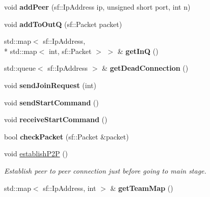 \begin{DoxyCompactItemize}
\item 
\hypertarget{class_connection_a1f5a89be211063901d17361e5f992562}{void {\bfseries add\+Peer} (sf\+::\+Ip\+Address ip, unsigned short port, int n)}\label{class_connection_a1f5a89be211063901d17361e5f992562}

\item 
\hypertarget{class_connection_aceeafc33d745b590e3dc3129c7dd7066}{void {\bfseries add\+To\+Out\+Q} (sf\+::\+Packet packet)}\label{class_connection_aceeafc33d745b590e3dc3129c7dd7066}

\item 
\hypertarget{class_connection_ac82e6e85a7c9eb30a6990415355d5a71}{std\+::map$<$ sf\+::\+Ip\+Address, \\*
std\+::map$<$ int, sf\+::\+Packet $>$ $>$ \& {\bfseries get\+In\+Q} ()}\label{class_connection_ac82e6e85a7c9eb30a6990415355d5a71}

\item 
\hypertarget{class_connection_aedd80a7aab0e950d3fad23e5e0c7feed}{std\+::queue$<$ sf\+::\+Ip\+Address $>$ \& {\bfseries get\+Dead\+Connection} ()}\label{class_connection_aedd80a7aab0e950d3fad23e5e0c7feed}

\item 
\hypertarget{class_connection_a7a399908579770f58ca3af78826e931a}{void {\bfseries send\+Join\+Request} (int)}\label{class_connection_a7a399908579770f58ca3af78826e931a}

\item 
\hypertarget{class_connection_a7b7d6a5cc92e8f34527c6483951c46c2}{void {\bfseries send\+Start\+Command} ()}\label{class_connection_a7b7d6a5cc92e8f34527c6483951c46c2}

\item 
\hypertarget{class_connection_ab8daba91f34149949be7b6481967538a}{void {\bfseries receive\+Start\+Command} ()}\label{class_connection_ab8daba91f34149949be7b6481967538a}

\item 
\hypertarget{class_connection_a73a9ae800c1f83a294d934ced1bff8be}{bool {\bfseries check\+Packet} (sf\+::\+Packet \&packet)}\label{class_connection_a73a9ae800c1f83a294d934ced1bff8be}

\item 
\hypertarget{class_connection_ab9b5dccdf06a8a24489daecf1670b04b}{void \hyperlink{class_connection_ab9b5dccdf06a8a24489daecf1670b04b}{establish\+P2\+P} ()}\label{class_connection_ab9b5dccdf06a8a24489daecf1670b04b}

\begin{DoxyCompactList}\small\item\em Establish peer to peer connection just before going to main stage. \end{DoxyCompactList}\item 
\hypertarget{class_connection_a12d6553fe23f62b121dd6875fb717bf1}{std\+::map$<$ sf\+::\+Ip\+Address, int $>$ \& {\bfseries get\+Team\+Map} ()}\label{class_connection_a12d6553fe23f62b121dd6875fb717bf1}

\end{DoxyCompactItemize}
